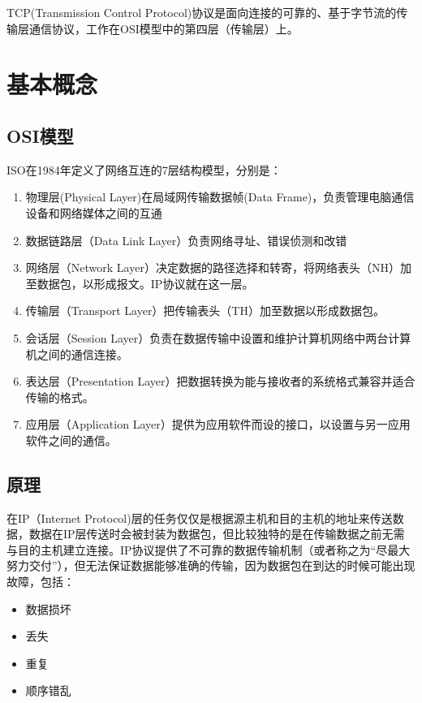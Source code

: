 \documentclass[12pt]{article}
\begin{document}
\makeblogtitle

TCP(Transmission Control Protocol)协议是面向连接的可靠的、基于字节流的传输层通信协议，工作在OSI模型中的第四层（传输层）上。

\section{基本概念}\label{ux57faux672cux6982ux5ff5}

\subsection{OSI模型}\label{osiux6a21ux578b}

ISO在1984年定义了网络互连的7层结构模型，分别是：

\begin{enumerate}
\def\labelenumi{\arabic{enumi}.}
\tightlist
\item
  物理层(Physical Layer)在局域网传输数据帧(Data Frame)，负责管理电脑通信设备和网络媒体之间的互通
\item
  数据链路层（Data Link Layer）负责网络寻址、错误侦测和改错
\item
  网络层（Network Layer）决定数据的路径选择和转寄，将网络表头（NH）加至数据包，以形成报文。IP协议就在这一层。
\item
  传输层（Transport Layer）把传输表头（TH）加至数据以形成数据包。
\item
  会话层（Session Layer）负责在数据传输中设置和维护计算机网络中两台计算机之间的通信连接。
\item
  表达层（Presentation Layer）把数据转换为能与接收者的系统格式兼容并适合传输的格式。
\item
  应用层（Application Layer）提供为应用软件而设的接口，以设置与另一应用软件之间的通信。
\end{enumerate}

\subsection{原理}\label{ux539fux7406}

在IP（Internet Protocol)层的任务仅仅是根据源主机和目的主机的地址来传送数据，数据在IP层传送时会被封装为数据包，但比较独特的是在传输数据之前无需与目的主机建立连接。IP协议提供了不可靠的数据传输机制（或者称之为``尽最大努力交付''），但无法保证数据能够准确的传输，因为数据包在到达的时候可能出现故障，包括：

\begin{itemize}
\tightlist
\item
  数据损坏
\item
  丢失
\item
  重复
\item
  顺序错乱
\end{itemize}
\end{document}
